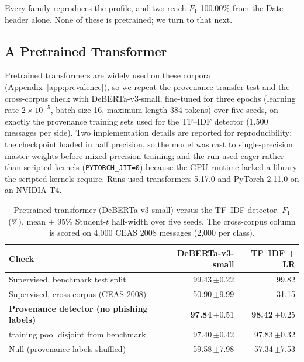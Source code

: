 \documentclass[twoside,11pt]{article}
\newcommand{\gd}[1]{\textbf{#1}}
\begin{document}
Every family reproduces the profile, and two reach $F_1$ 100.00\% from the
Date header alone. None of these is pretrained; we turn to that next.

\subsection{A Pretrained Transformer}
\label{sec:transformer}

Pretrained transformers are widely used on these corpora
(Appendix~\ref{app:prevalence}), so we repeat the provenance-transfer test and the cross-corpus check with
DeBERTa-v3-small, fine-tuned for three epochs (learning rate
$2\times10^{-5}$, batch size 16, maximum length 384 tokens) over five seeds,
on exactly the provenance training sets used for the TF--IDF detector (1{,}500
messages per side). Two implementation details are reported for
reproducibility: the checkpoint loaded in half precision, so the model was cast
to single-precision master weights before mixed-precision training; and the
run used eager rather than scripted kernels (\texttt{PYTORCH\_JIT=0}) because
the GPU runtime lacked a library the scripted kernels require. Runs used
transformers 5.17.0 and PyTorch 2.11.0 on an NVIDIA T4.

\begin{table}[t]
\centering\small
\caption{Pretrained transformer (DeBERTa-v3-small) versus the TF--IDF
detector. $F_1$ (\%), mean $\pm$ 95\% Student-$t$ half-width over five
seeds. The cross-corpus column is scored on 4{,}000 CEAS 2008 messages (2{,}000
per class).}
\label{tab:transformer}
\begin{tabular}{lrr}
\toprule
Check & DeBERTa-v3-small & TF--IDF + LR \\
\midrule
Supervised, benchmark test split & 99.43\,$\pm$0.22 & 99.82 \\
Supervised, cross-corpus (CEAS 2008) & 50.90\,$\pm$9.99 & 31.15 \\
\gd{Provenance detector (no phishing labels)} & \gd{97.84}\,$\pm$0.51 & \gd{98.42}\,$\pm$0.25 \\
\quad training pool disjoint from benchmark & 97.40\,$\pm$0.42 & 97.83\,$\pm$0.32 \\
Null (provenance labels shuffled) & 59.58\,$\pm$7.98 & 57.34\,$\pm$7.53 \\
\bottomrule
\end{tabular}
\end{table}
\end{document}

